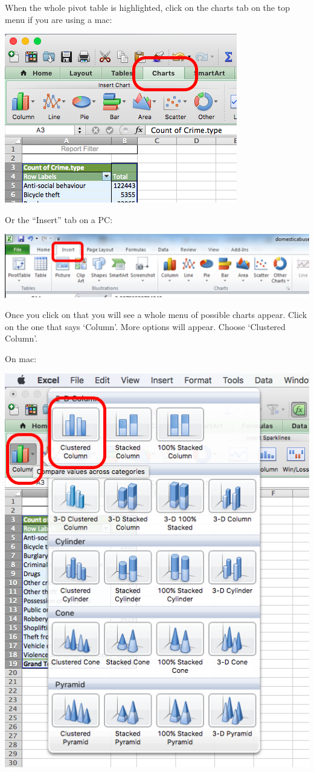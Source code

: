 \documentclass[]{book}
\theoremstyle{definition}
\theoremstyle{definition}
\theoremstyle{definition}
\theoremstyle{remark}
\begin{document}
When the whole pivot table is highlighted, click on the charts tab on
the top menu if you are using a mac:

\includegraphics{imgs/click_charts_tab.png}

Or the ``Insert'' tab on a PC:

\includegraphics{imgs/on_pc_insert.png}

Once you click on that you will see a whole menu of possible charts
appear. Click on the one that says `Column'. More options will appear.
Choose `Clustered Column'.

On mac:

\includegraphics{imgs/click_column.png}
\end{document}
